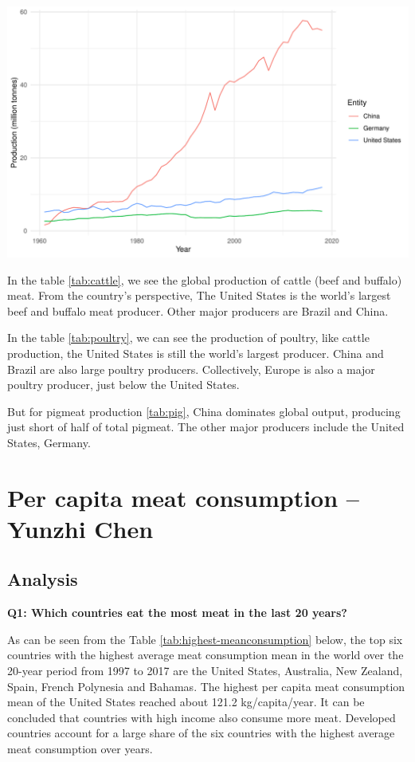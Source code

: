 \documentclass[11pt,a4paper,]{article}
\begin{document}
\includegraphics{report_files/figure-latex/pig-1.pdf}

In the table \ref{tab:cattle}, we see the global production of cattle (beef and buffalo) meat. From the country's perspective, The United States is the world's largest beef and buffalo meat producer. Other major producers are Brazil and China.

In the table \ref{tab:poultry}, we can see the production of poultry, like cattle production, the United States is still the world's largest producer. China and Brazil are also large poultry producers. Collectively, Europe is also a major poultry producer, just below the United States.

But for pigmeat production \ref{tab:pig}, China dominates global output, producing just short of half of total pigmeat. The other major producers include the United States, Germany.
\clearpage

\section*{Per capita meat consumption -- Yunzhi Chen}

\subsection*{Analysis}

\textbf{Q1: Which countries eat the most meat in the last 20 years? }

As can be seen from the Table \ref{tab:highest-meanconsumption} below, the top six countries with the highest average meat consumption mean in the world over the 20-year period from 1997 to 2017 are the United States, Australia, New Zealand, Spain, French Polynesia and Bahamas. The highest per capita meat consumption mean of the United States reached about 121.2 kg/capita/year. It can be concluded that countries with high income also consume more meat. Developed countries account for a large share of the six countries with the highest average meat consumption over years.
\end{document}
